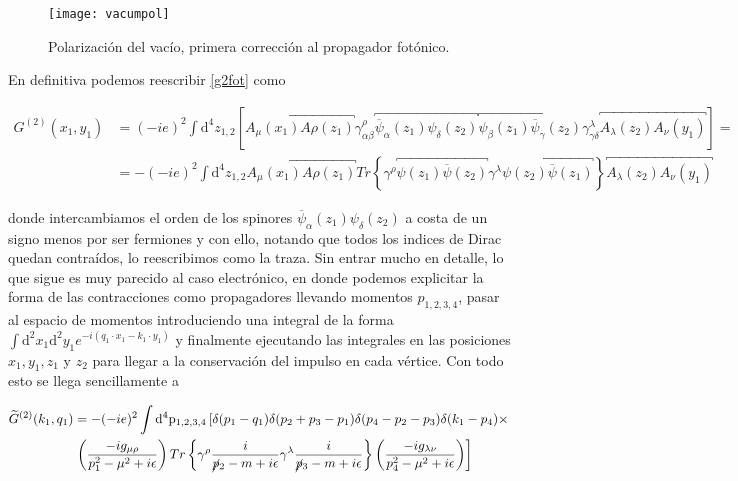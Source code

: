 \documentclass[tickz]{article}
\numberwithin{equation}{section}
\begin{document}
\begin{figure}[h]
	\centering
	\texttt{[image: vacumpol]}
	\caption{Polarización del vacío, primera corrección al propagador fotónico.\texttt{}}
	\label{fig_vacumpol}
\end{figure}



En definitiva podemos reescribir \ref{g2fot} como

\begin{equation}\label{key}
\begin{aligned}
G^{(2)}(x_{1},y_{1})&=(-ie)^{2}\int \mathrm{\mathrm{d^4}}z_{1,2}\left[\overbracket{A_{\mu}(x_{1})A{\rho}(z_1)} \gamma^{\rho}_{\alpha\beta} \overbracket{\overline{\psi}_{\alpha}(z_1)\psi_{\delta}(z_{2})}\overbracket{\psi_{\beta}(z_{1})\overline{\psi}_{\gamma}(z_2)} \gamma^{\lambda}_{\gamma\delta}\overbracket{A_{\lambda}(z_2)A_{\nu}(y_1)}\right]=\\
&=-(-ie)^{2}\int \mathrm{\mathrm{d^4}}z_{1,2}\overbracket{A_{\mu}(x_{1})A{\rho}(z_1)} Tr\left\{ \gamma^{\rho} \overbracket{\psi(z_{1})\overline{\psi}(z_2)} \gamma^{\lambda}\overbracket{\psi(z_{2})\overline{\psi}(z_1)}\right\}\overbracket{A_{\lambda}(z_2)A_{\nu}(y_1)}
\end{aligned}
\end{equation}

donde intercambiamos el orden de los spinores $ \overline{\psi}_{\alpha}(z_1)\psi_{\delta}(z_{2}) $ a costa de un signo menos por ser fermiones y con ello, notando que todos los indices de Dirac quedan contraídos, lo reescribimos como la traza. Sin entrar mucho en detalle, lo que sigue es muy parecido al caso electrónico, en donde podemos explicitar la forma de las contracciones como propagadores llevando momentos $ p_{1,2,3,4} $, pasar al espacio de momentos introduciendo una integral de la forma $ \int \mathrm{d^2}x_1\mathrm{d^2}y_1 e^{-i\left(q_1 \cdot x_1-k_1 \cdot y_1 \right)}$ y finalmente ejecutando las integrales en las posiciones $ x_1, y_1, z_1 $ y $ z_2 $ para llegar a la conservación del impulso en cada vértice. Con todo esto se llega sencillamente a

\begin{equation}\label{key}
\begin{aligned}
\widetilde{G}^{(2)}(k_{1},q_{1})&=-(-ie)^{2} \int \mathrm{\mathrm{d^4}p_{1,2,3,4}}  \left[  \delta (p_1 -q_1) \delta(p_2 + p_3 - p_1) \delta (p_4 - p_2 - p_3) \delta (k_1 - p_4) \times \right.\\
& \left. \left(\frac{-ig_{\mu \rho}}{p_1^2 - \mu^2 +i\epsilon}\right) Tr\left\{ \gamma^{\rho} \frac{i}{\cancel{p}_2 -m+i\epsilon} \gamma^{\lambda} \frac{i}{\cancel{p}_3 -m +i\epsilon}   \right\} \left(\frac{-ig_{\lambda \nu}}{p_4^2 - \mu^2 +i\epsilon}\right)\right] 
\end{aligned}
\end{equation}
\end{document}
